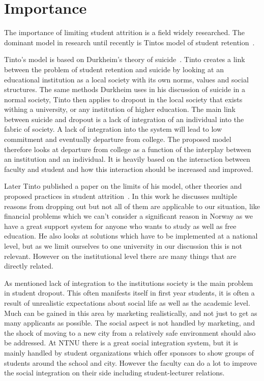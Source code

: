 \section{Importance}
The importance of limiting student attrition is a field widely researched.
The dominant model in research until recently is Tintos model of student retention~\cite{1982}.

\bigskip\noindent
Tinto's model is based on Durkheim's theory of suicide~\cite{Tinto01031975}.
Tinto creates a link between the problem of student retention and suicide by looking at an educational institution as a local society with its own norms, values and social structures.
The same methods Durkheim uses in his discussion of suicide in a normal society, 
Tinto then applies to dropout in the local society that exists withing a university, 
or any institution of higher education.
The main link between suicide and dropout is a lack of integration of an individual into the fabric of society.
A lack of integration into the system will lead to low commitment and eventually departure from college.
The proposed model therefore looks at departure from college as a function of the interplay between an institution and an individual.
It is heavily based on the interaction between faculty and student and how this interaction should be increased and improved.

\bigskip\noindent
Later Tinto published a paper on the limits of his model, other theories and proposed practices in student attrition~\cite{1982}.
In this work he discusses multiple reasons from dropping out but not all of them are applicable to our situation, like financial problems which we can't consider a significant reason in Norway as we have a great support system for anyone who wants to study as well as free education.
He also looks at solutions which have to be implemented at a national level, but as we limit ourselves to one university in our discussion this is not relevant.
However on the institutional level there are many things that are directly related.

\bigskip\noindent
As mentioned lack of integration to the institutions society is the main problem in student dropout.
This often manifests itself in first year students, it is often a result of unrealistic expectations about social life as well as the academic level.
Much can be gained in this area by marketing realistically, and not just to get as many applicants as possible.
The social aspect is not handled by marketing, and the shock of moving to a new city from a relatively safe environment should also be addressed.
At NTNU there is a great social integration system, but it is mainly handled by student organizations which offer sponsors to show groups of students around the school and city.
However the faculty can do a lot to improve the social integration on their side including student-lecturer relations.

